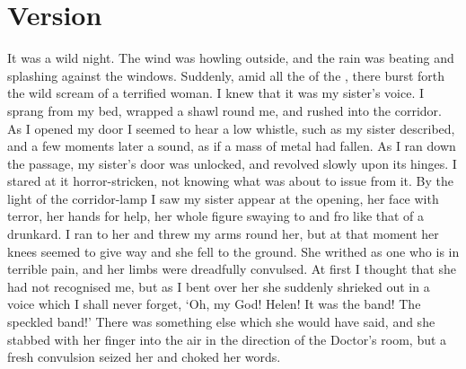\documentclass{fiche}
\begin{document}
\newpage
\section{Version}

\begin{version}
It was a wild night. The wind was howling outside, and the rain was beating and splashing
against the windows. Suddenly, amid all the  of the
, there burst forth the wild scream of a
terrified woman. I knew that it was my sister's voice. I sprang from my bed, wrapped a shawl
round me, and rushed into the corridor. As I opened my door I seemed to hear a low whistle,
such as my sister described, and a few moments later a
 sound, as if a mass of metal had fallen. As
I ran down the passage, my sister's door was unlocked, and revolved slowly upon its hinges. I
stared at it horror-stricken, not knowing what was about to issue from it. By the light of the
corridor-lamp I saw my sister appear at the opening, her face
 with terror, her hands  for
help, her whole figure swaying to and fro like that of a drunkard. I ran to her and threw my
arms round her, but at that moment her knees seemed to give way and she fell to the ground.
She writhed as one who is in terrible pain, and her limbs were dreadfully convulsed. At first
I thought that she had not recognised me, but as I bent over her she suddenly shrieked out in
a voice which I shall never forget, `Oh, my God! Helen! It was the band! The speckled band!'
There was something else which she would  have said, and she
stabbed with her finger into the air in the direction of the Doctor's room, but a fresh
convulsion seized her and choked her words.
\end{version}

\end{document}
